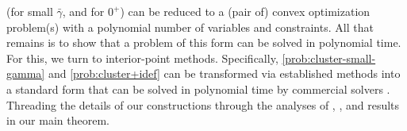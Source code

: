 \documentclass{article}
\newcommand\zogamma{{\bar\gamma}}
\begin{document}
(for small $\zogamma$, and for $0^+$)
%
can be reduced to a (pair of) convex optimization problem(s) with a
polynomial number of variables and constraints.
All that remains 
is to show that a problem of this form can be solved in polynomial time.
For this, we turn to interior-point methods.
Specifically, \eqref{prob:cluster-small-gamma} and \eqref{prob:cluster+idef} can be transformed via established methods \parencite{agrawal2018rewriting} into
a standard form
that
can be solved in polynomial time by commercial solvers \parencite{mosek,ECOS}.
Threading the details of our constructions through
the analyses of \textcite{dahl2022primal}, \textcite{skajaa2015homogeneous}, and \textcite{nesterov1996infeasible}
results in our main theorem.


\end{document}
